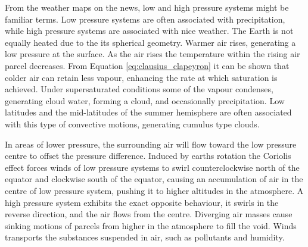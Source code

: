From the weather maps on the news, low and high pressure systems might be familiar terms. Low pressure systems are often associated with precipitation, while high pressure systems are associated with nice weather. The Earth is not equally heated due to the its spherical geometry. Warmer air rises, generating a low pressure at the surface. As the air rises the temperature within the rising air parcel decreases. From Equation \eqref{eq:clausius_clapeyron} it can be shown that colder air can retain less vapour, enhancing the rate at which saturation is achieved. Under supersaturated conditions some of the vapour condenses, generating cloud water, forming a cloud, and occasionally precipitation. Low latitudes and the mid-latitudes of the summer hemisphere are often associated with this type of convective motions, generating cumulus type clouds. 

In areas of lower pressure, the surrounding air will flow toward the low pressure centre to offset the pressure difference. Induced by earths rotation the Coriolis effect forces winds of low pressure systems to swirl counterclockwise north of the equator and clockwise south of the equator, causing an accumulation of air in the centre of low pressure system, pushing it to higher altitudes in the atmosphere. A high pressure system exhibits the exact opposite behaviour, it swirls in the reverse direction, and the air flows from the centre. Diverging air masses cause sinking motions of parcels from higher in the atmosphere to fill the void. 
Winds transports the substances suspended in air, such as pollutants and humidity. 

